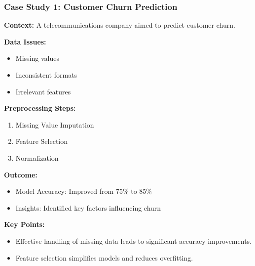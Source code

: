 \documentclass[aspectratio=169]{beamer}
\begin{document}
\begin{frame}[fragile]
    \frametitle{Case Study 1: Customer Churn Prediction}
    \textbf{Context:} A telecommunications company aimed to predict customer churn.

    \textbf{Data Issues:}
    \begin{itemize}
        \item Missing values
        \item Inconsistent formats
        \item Irrelevant features
    \end{itemize}

    \textbf{Preprocessing Steps:}
    \begin{enumerate}
        \item Missing Value Imputation
        \item Feature Selection
        \item Normalization
    \end{enumerate}

    \textbf{Outcome:}
    \begin{itemize}
        \item Model Accuracy: Improved from 75\% to 85\% 
        \item Insights: Identified key factors influencing churn
    \end{itemize}

    \textbf{Key Points:}
    \begin{itemize}
        \item Effective handling of missing data leads to significant accuracy improvements.
        \item Feature selection simplifies models and reduces overfitting.
    \end{itemize}
\end{frame}
\end{document}
